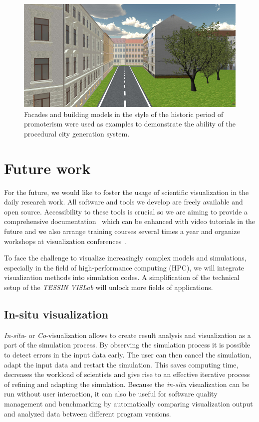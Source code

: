 \documentclass[twocolumn]{svjour3}          %
\begin{document}
\begin{figure}[htb]
  \includegraphics[width=\linewidth]{images/city.jpg}
\caption{Facades and building models in the style of the historic period of promoterism were used as examples to demonstrate the ability of the procedural city generation system.}
\label{fig:city}
\end{figure}

\section{Future work}
\label{future-work}

For the future, we would like to foster the usage of scientific visualization in the daily research work. All software and tools we develop are freely available and open source. Accessibility to these tools is crucial so we are aiming to provide a comprehensive documentation~\cite{web:ogs-docs} which can be enhanced with video tutorials in the future and we also arrange training courses several times a year and organize workshops at visualization conferences~\cite{web:envirvis}.

To face the challenge to visualize increasingly complex models and simulations, especially in the field of high-performance computing (HPC), we will integrate visualization methods into simulation codes. A simplification of the technical setup of the \emph{TESSIN VISLab} will unlock more fields of applications.

\subsection{In-situ visualization}
\label{in-situ-visualization}

\emph{In-situ}- or \emph{Co}-visualization allows to create result analysis and visualization as a part of the simulation process. By observing the simulation process it is possible to detect errors in the input data early. The user can then cancel the simulation, adapt the input data and restart the simulation. This saves computing time, decreases the workload of scientists and give rise to an effective iterative process of refining and adapting the simulation. Because the \emph{in-situ} visualization can be run without user interaction, it can also be useful for software quality management and benchmarking by automatically comparing visualization output and analyzed data between different program versions.
\end{document}
